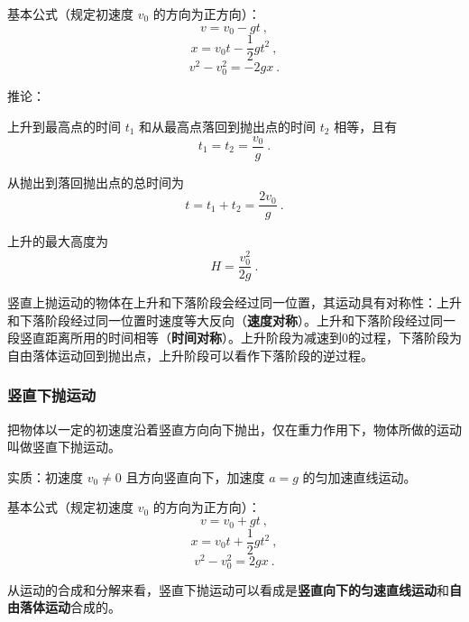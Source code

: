 基本公式（规定初速度 $v_0$ 的方向为正方向）：
\begin{equation}
v=v_0-gt~,
\end{equation}
\begin{equation}
x=v_0t-\frac12gt^2~,
\end{equation}
\begin{equation}
v^2-v_0^2=-2gx~.
\end{equation}

推论：

上升到最高点的时间 $t_1$ 和从最高点落回到抛出点的时间 $t_2$ 相等，且有
\begin{equation}
t_1=t_2=\frac{v_0}{g}~.
\end{equation}

从抛出到落回抛出点的总时间为
\begin{equation}
t=t_1+t_2=\frac{2v_0}{g}~.
\end{equation}

上升的最大高度为
\begin{equation}
H=\frac{v_0^2}{2g}~.
\end{equation}

竖直上抛运动的物体在上升和下落阶段会经过同一位置，其运动具有对称性：上升和下落阶段经过同一位置时速度等大反向（\textbf{速度对称}）。上升和下落阶段经过同一段竖直距离所用的时间相等（\textbf{时间对称}）。上升阶段为减速到0的过程，下落阶段为自由落体运动回到抛出点，上升阶段可以看作下落阶段的逆过程。

\subsubsection{竖直下抛运动}
把物体以一定的初速度沿着竖直方向向下抛出，仅在重力作用下，物体所做的运动叫做竖直下抛运动。

实质：初速度 $v_0\neq0$ 且方向竖直向下，加速度 $a=g$ 的匀加速直线运动。

基本公式（规定初速度 $v_0$ 的方向为正方向）：
\begin{equation}
v=v_0+gt~,
\end{equation}
\begin{equation}
x=v_0t+\frac12gt^2~,
\end{equation}
\begin{equation}
v^2-v_0^2=2gx~.
\end{equation}

从运动的合成和分解来看，竖直下抛运动可以看成是\textbf{竖直向下的匀速直线运动}和\textbf{自由落体运动}合成的。
